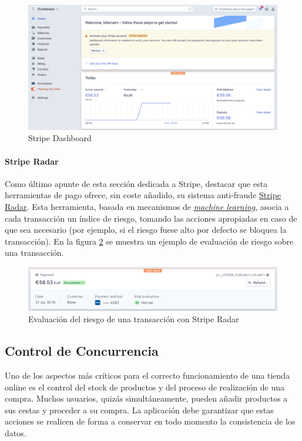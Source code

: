 \documentclass[a4paper]{article}
\begin{document}
    \begin{figure}[hbt!]
    	\centering
    	\includegraphics[width=\textwidth,keepaspectratio]{stripe_dashboard}
    	\caption{Stripe Dashboard}
    	\label{fig:stripe_dashboard}
    \end{figure}
    
    \paragraph{Stripe Radar}
    Como último apunte de esta sección dedicada a Stripe, destacar que esta herramientas de pago ofrece, sin coste añadido, su sistema anti-fraude \href{https://stripe.com/es/radar}{Stripe Radar}. Esta herramienta, basada en mecanismos de \href{https://stripe.com/es/radar/guide}{\emph{machine learning}}, asocia a cada transacción un índice de riesgo, tomando las acciones apropiadas en caso de que sea necesario (por ejemplo, si el riesgo fuese alto por defecto se bloquea la transacción). En la figura \ref{fig:stripe_radar} se muestra un ejemplo de evaluación de riesgo sobre una transacción.
    
    \begin{figure}[hbt!]
    	\centering
    	\includegraphics[width=\textwidth,keepaspectratio]{stripe_radar}
    	\caption{Evaluación del riesgo de una transacción con Stripe Radar}
    	\label{fig:stripe_radar}
    \end{figure}
    
    \subsection{Control de Concurrencia} \label{sec:concurrencia}
    Uno de los aspectos más críticos para el correcto funcionamiento de una tienda online es el control del stock de productos y del proceso de realización de una compra. Muchos usuarios, quizás simultáneamente, pueden añadir productos a sus cestas y proceder a su compra. La aplicación debe garantizar que estas acciones se realicen de forma a conservar en todo momento la consistencia de los datos.
    
\end{document}
